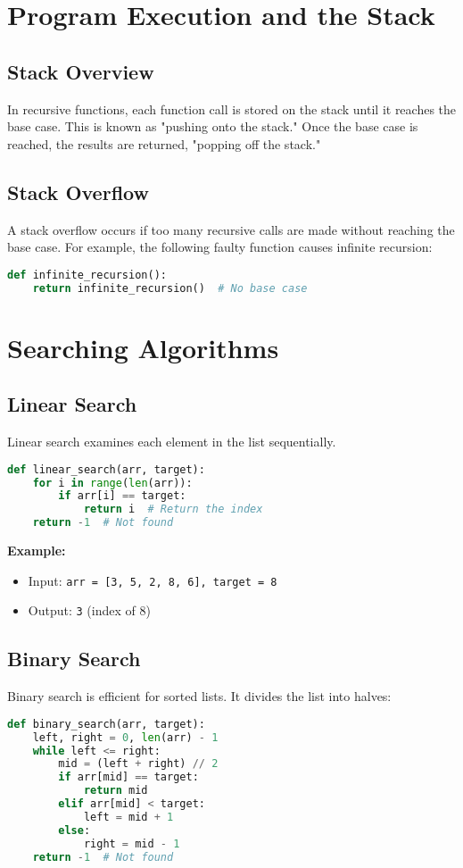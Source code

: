 \documentclass{article}
\begin{document}
\section{Program Execution and the Stack}
\subsection{Stack Overview}
In recursive functions, each function call is stored on the stack until it reaches the base case. This is known as "pushing onto the stack." Once the base case is reached, the results are returned, "popping off the stack."

\subsection{Stack Overflow}
A stack overflow occurs if too many recursive calls are made without reaching the base case. For example, the following faulty function causes infinite recursion:
\begin{lstlisting}[language=Python]
def infinite_recursion():
    return infinite_recursion()  # No base case
\end{lstlisting}

\section{Searching Algorithms}
\subsection{Linear Search}
Linear search examines each element in the list sequentially. 
\begin{lstlisting}[language=Python]
def linear_search(arr, target):
    for i in range(len(arr)):
        if arr[i] == target:
            return i  # Return the index
    return -1  # Not found
\end{lstlisting}
\textbf{Example:}
\begin{itemize}
    \item Input: \texttt{arr = [3, 5, 2, 8, 6], target = 8}
    \item Output: \texttt{3} (index of 8)
\end{itemize}

\subsection{Binary Search}
Binary search is efficient for sorted lists. It divides the list into halves:
\begin{lstlisting}[language=Python]
def binary_search(arr, target):
    left, right = 0, len(arr) - 1
    while left <= right:
        mid = (left + right) // 2
        if arr[mid] == target:
            return mid
        elif arr[mid] < target:
            left = mid + 1
        else:
            right = mid - 1
    return -1  # Not found
\end{lstlisting}
\end{document}
